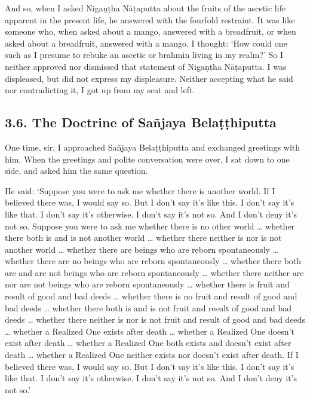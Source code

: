 \documentclass[12pt,openany]{book}%
\begin{document}
And so, when I asked \textsanskrit{Nigaṇṭha} \textsanskrit{Nāṭaputta} about the fruits of the ascetic life apparent in the present life, he answered with the fourfold restraint. It was like someone who, when asked about a mango, answered with a breadfruit, or when asked about a breadfruit, answered with a mango. I thought: ‘How could one such as I presume to rebuke an ascetic or brahmin living in my realm?’ So I neither approved nor dismissed that statement of \textsanskrit{Nigaṇṭha} \textsanskrit{Nāṭaputta}. I was displeased, but did not express my displeasure. Neither accepting what he said nor contradicting it, I got up from my seat and left. 

\subsection*{3.6. The Doctrine of \textsanskrit{Sañjaya} \textsanskrit{Belaṭṭhiputta} }

One time, sir, I approached \textsanskrit{Sañjaya} \textsanskrit{Belaṭṭhiputta} and exchanged greetings with him. When the greetings and polite conversation were over, I sat down to one side, and asked him the same question. 

He said: ‘Suppose you were to ask me whether there is another world. If I believed there was, I would say so. But I don’t say it’s like this. I don’t say it’s like that. I don’t say it’s otherwise. I don’t say it’s not so. And I don’t deny it’s not so. Suppose you were to ask me whether there is no other world … whether there both is and is not another world … whether there neither is nor is not another world … whether there are beings who are reborn spontaneously … whether there are no beings who are reborn spontaneously … whether there both are and are not beings who are reborn spontaneously … whether there neither are nor are not beings who are reborn spontaneously … whether there is fruit and result of good and bad deeds … whether there is no fruit and result of good and bad deeds … whether there both is and is not fruit and result of good and bad deeds … whether there neither is nor is not fruit and result of good and bad deeds … whether a Realized One exists after death … whether a Realized One doesn’t exist after death … whether a Realized One both exists and doesn’t exist after death … whether a Realized One neither exists nor doesn’t exist after death. If I believed there was, I would say so. But I don’t say it’s like this. I don’t say it’s like that. I don’t say it’s otherwise. I don’t say it’s not so. And I don’t deny it’s not so.’ 
\end{document}
